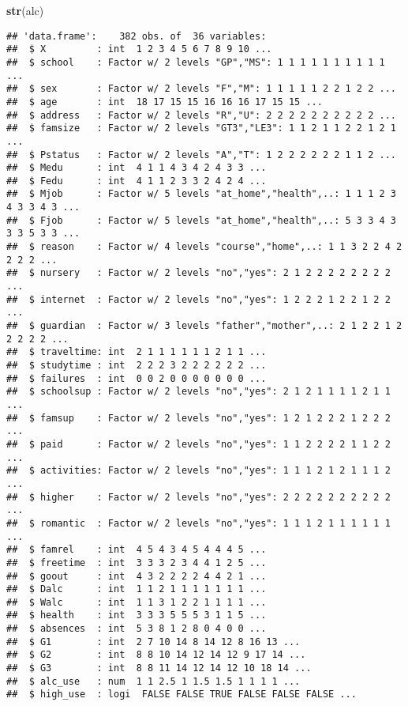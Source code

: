 \documentclass[]{article}
\newenvironment{Shaded}{\begin{snugshade}}{\end{snugshade}}
\newcommand{\KeywordTok}[1]{\textcolor[rgb]{0.13,0.29,0.53}{\textbf{#1}}}
\newcommand{\NormalTok}[1]{#1}
\begin{document}
\begin{Shaded}
\begin{Highlighting}[]
\KeywordTok{str}\NormalTok{(alc)}
\end{Highlighting}
\end{Shaded}

\begin{verbatim}
## 'data.frame':    382 obs. of  36 variables:
##  $ X         : int  1 2 3 4 5 6 7 8 9 10 ...
##  $ school    : Factor w/ 2 levels "GP","MS": 1 1 1 1 1 1 1 1 1 1 ...
##  $ sex       : Factor w/ 2 levels "F","M": 1 1 1 1 1 2 2 1 2 2 ...
##  $ age       : int  18 17 15 15 16 16 16 17 15 15 ...
##  $ address   : Factor w/ 2 levels "R","U": 2 2 2 2 2 2 2 2 2 2 ...
##  $ famsize   : Factor w/ 2 levels "GT3","LE3": 1 1 2 1 1 2 2 1 2 1 ...
##  $ Pstatus   : Factor w/ 2 levels "A","T": 1 2 2 2 2 2 2 1 1 2 ...
##  $ Medu      : int  4 1 1 4 3 4 2 4 3 3 ...
##  $ Fedu      : int  4 1 1 2 3 3 2 4 2 4 ...
##  $ Mjob      : Factor w/ 5 levels "at_home","health",..: 1 1 1 2 3 4 3 3 4 3 ...
##  $ Fjob      : Factor w/ 5 levels "at_home","health",..: 5 3 3 4 3 3 3 5 3 3 ...
##  $ reason    : Factor w/ 4 levels "course","home",..: 1 1 3 2 2 4 2 2 2 2 ...
##  $ nursery   : Factor w/ 2 levels "no","yes": 2 1 2 2 2 2 2 2 2 2 ...
##  $ internet  : Factor w/ 2 levels "no","yes": 1 2 2 2 1 2 2 1 2 2 ...
##  $ guardian  : Factor w/ 3 levels "father","mother",..: 2 1 2 2 1 2 2 2 2 2 ...
##  $ traveltime: int  2 1 1 1 1 1 1 2 1 1 ...
##  $ studytime : int  2 2 2 3 2 2 2 2 2 2 ...
##  $ failures  : int  0 0 2 0 0 0 0 0 0 0 ...
##  $ schoolsup : Factor w/ 2 levels "no","yes": 2 1 2 1 1 1 1 2 1 1 ...
##  $ famsup    : Factor w/ 2 levels "no","yes": 1 2 1 2 2 2 1 2 2 2 ...
##  $ paid      : Factor w/ 2 levels "no","yes": 1 1 2 2 2 2 1 1 2 2 ...
##  $ activities: Factor w/ 2 levels "no","yes": 1 1 1 2 1 2 1 1 1 2 ...
##  $ higher    : Factor w/ 2 levels "no","yes": 2 2 2 2 2 2 2 2 2 2 ...
##  $ romantic  : Factor w/ 2 levels "no","yes": 1 1 1 2 1 1 1 1 1 1 ...
##  $ famrel    : int  4 5 4 3 4 5 4 4 4 5 ...
##  $ freetime  : int  3 3 3 2 3 4 4 1 2 5 ...
##  $ goout     : int  4 3 2 2 2 2 4 4 2 1 ...
##  $ Dalc      : int  1 1 2 1 1 1 1 1 1 1 ...
##  $ Walc      : int  1 1 3 1 2 2 1 1 1 1 ...
##  $ health    : int  3 3 3 5 5 5 3 1 1 5 ...
##  $ absences  : int  5 3 8 1 2 8 0 4 0 0 ...
##  $ G1        : int  2 7 10 14 8 14 12 8 16 13 ...
##  $ G2        : int  8 8 10 14 12 14 12 9 17 14 ...
##  $ G3        : int  8 8 11 14 12 14 12 10 18 14 ...
##  $ alc_use   : num  1 1 2.5 1 1.5 1.5 1 1 1 1 ...
##  $ high_use  : logi  FALSE FALSE TRUE FALSE FALSE FALSE ...
\end{verbatim}
\end{document}
